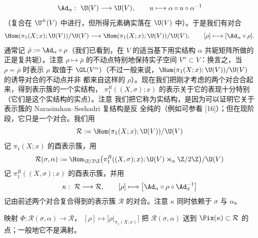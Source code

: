 \[
\Ad_\alpha:\ \U(V)\longrightarrow\U(V),\qquad u\longmapsto\alpha\circ u\circ\alpha^{-1}
\]
（复合在 $\U^{\pm}(V)$ 中进行，但所得元素确实落在 $\U(V)$ 中）。于是我们有对合
\[
\Hom(\pi_1(X;x);\U(V))/\U(V)\longrightarrow\Hom(\pi_1(X;x);\U(V))/\U(V),
\qquad [\rho]\longmapsto[\Ad_\alpha\circ\rho].
\]
通常记 $\bar\rho:=\Ad_\alpha\circ\rho$（我们已看到，在 $V$ 的适当基下用实结构 $\alpha$
共轭矩阵所做的正是复共轭）。注意 $\rho\mapsto\bar\rho$ 的不动点特别地保持实子空间
$V^\alpha\subset V$：换言之，当 $\rho=\bar\rho$ 时表示 $\rho$ 取值于
$\GL(V^\alpha)$（不过一般来说，$\Hom(\pi_1(X;x);\U(V))/\U(V)$ 的诱导对合的不动点并非
都来自这样的 $\rho$）。现在我们把刚才考虑的两个对合合起来，得到表示簇的一个实结构，
$\pi^R_1((X,\sigma);x)$ 的表示关于它的表现十分特别（它们是这个实结构的实点）。注意
我们把它称为实结构，是因为可以证明它关于表示簇的 Narasimhan--Seshadri 复结构是反
全纯的（例如可参看 [16]）；但在现阶段，它只是一个对合。我们用
\[
\mathcal{R}:=\Hom(\pi_1(X;x);\U(V))/\U(V)
\]
记 $\pi_1(X;x)$ 的酉表示簇，用
\begin{equation}\label{eq:2.24}
\mathcal{R}(\sigma,\alpha):=
\Hom_{\Z/2\Z}\bigl(\pi^R_1((X,\sigma);x);\U(V)\rtimes_\alpha\Z/2\Z\bigr)/\U(V)
\end{equation}
记 $\pi^R_1((X,\sigma);x)$ 的酉表示簇，并用
\begin{equation}\label{eq:2.25}
\kappa:\ \mathcal{R}\longrightarrow\mathcal{R},
\qquad [\rho]\longmapsto\bigl[\Ad_\alpha\circ\rho\circ\Ad_{\tilde\sigma}^{-1}\bigr]
\end{equation}
记由前述两个对合复合得到的表示簇 $\mathcal{R}$ 的对合。注意 $\kappa$ 同时依赖于
$\sigma$ 与 $\alpha$。

\begin{theorem}\label{thm:2.3.4}
映射 $\Phi:\mathcal{R}(\sigma,\alpha)\to\mathcal{R}$，
$[\rho]\mapsto\bigl[\rho|_{\pi_1(X;x)}\bigr]$ 把 $\mathcal{R}(\sigma,\alpha)$ 送到
$\Fix(\kappa)\subset\mathcal{R}$ 的点；一般地它不是满射。
\end{theorem}

